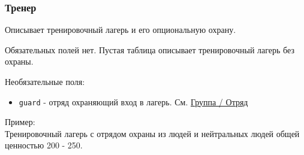 \subsubsection{Тренер}
\label{trainer}
Описывает тренировочный лагерь и его опциональную охрану.

Обязательных полей нет. Пустая таблица описывает тренировочный лагерь без охраны.

Необязательные поля:
\begin{itemize}
\item \texttt{guard} - отряд охраняющий вход в лагерь. См. \hyperref[group]{Группа / Отряд}
\end{itemize}

Пример:\\
Тренировочный лагерь с отрядом охраны из людей и нейтральных людей общей ценностью 200 - 250.

\begin{figure}[H]

\end{figure}